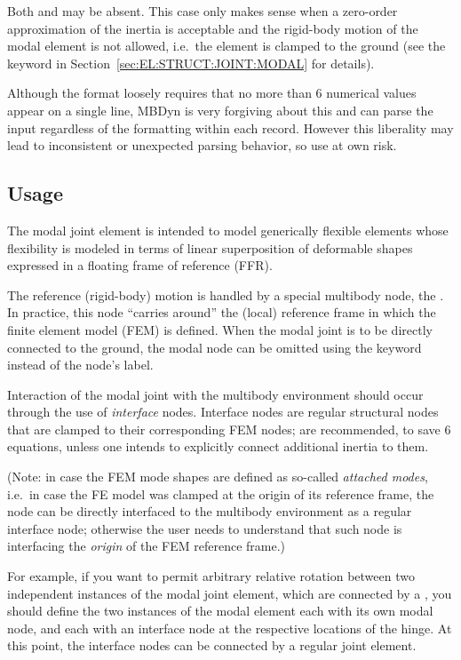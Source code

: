 Both  and  may be absent.
This case only makes sense when a zero-order approximation
of the inertia is acceptable and the rigid-body motion
of the modal element is not allowed, i.e.\ the element is clamped
to the ground (see the keyword 
in Section~\ref{sec:EL:STRUCT:JOINT:MODAL} for details).


Although the format loosely requires that no more than 6 numerical values 
appear on a single line, MBDyn is very forgiving about this and can parse
the input regardless of the formatting within each record.
However this liberality may lead to inconsistent or unexpected parsing
behavior, so use at own risk.



\subsection{Usage}
The modal joint element is intended to model generically flexible elements
whose flexibility is modeled in terms of linear superposition
of deformable shapes expressed in a floating frame of reference (FFR).

The reference (rigid-body) motion is handled by a special multibody node,
the .  
In practice, this node ``carries around'' the (local) reference frame
in which the finite element model (FEM) is defined.
When the modal joint is to be directly connected to the ground,
the modal node can be omitted using the  keyword
instead of the node's label.

Interaction of the modal joint with the multibody environment should occur
through the use of \emph{interface} nodes.
Interface nodes are regular structural nodes that are clamped 
to their corresponding FEM nodes;
 are recommended, to save 6 equations,
unless one intends to explicitly connect additional inertia to them.

(Note: in case the FEM mode shapes are defined as so-called \emph{attached modes},
i.e.\ in case the FE model was clamped at the origin of its reference frame,
the  node can be directly interfaced to the multibody environment as a regular interface node;
otherwise the user needs to understand that such node is interfacing the \emph{origin}
of the FEM reference frame.)

For example, if you want to permit arbitrary relative rotation
between two independent instances of the modal joint element,
which are connected by a ,
you should define the two instances of the modal element each with its own modal node,
and each with an interface node at the respective locations of the hinge.
At this point, the interface nodes can be connected
by a regular  joint element.




